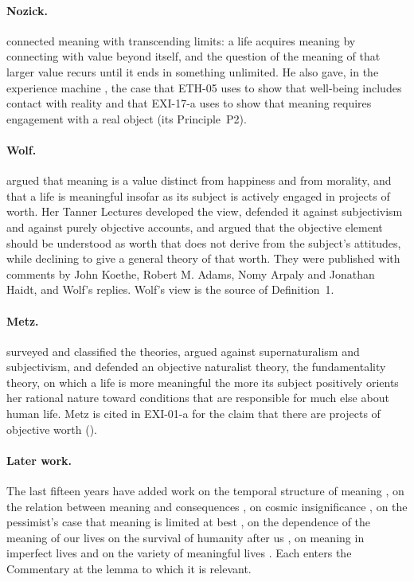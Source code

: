 \paragraph{Nozick.} \citet[ch.~6]{Nozick1981} connected meaning with transcending limits: a life acquires meaning by connecting with value beyond itself, and the question of the meaning of that larger value recurs until it ends in something unlimited. He also gave, in the experience machine \citep[42--45]{Nozick1974}, the case that ETH-05 uses to show that well-being includes contact with reality and that EXI-17-a uses to show that meaning requires engagement with a real object (its Principle~P2).

\paragraph{Wolf.} \citet{Wolf1997} argued that meaning is a value distinct from happiness and from morality, and that a life is meaningful insofar as its subject is actively engaged in projects of worth. Her Tanner Lectures \citep{Wolf2010} developed the view, defended it against subjectivism and against purely objective accounts, and argued that the objective element should be understood as worth that does not derive from the subject's attitudes, while declining to give a general theory of that worth. They were published with comments by John Koethe, Robert M. Adams, Nomy Arpaly and Jonathan Haidt, and Wolf's replies. Wolf's view is the source of Definition~1.

\paragraph{Metz.} \citet{Metz2013} surveyed and classified the theories, argued against supernaturalism and subjectivism, and defended an objective naturalist theory, the fundamentality theory, on which a life is more meaningful the more its subject positively orients her rational nature toward conditions that are responsible for much else about human life. Metz is cited in EXI-01-a for the claim that there are projects of objective worth ().

\paragraph{Later work.} The last fifteen years have added work on the temporal structure of meaning \citep{Kauppinen2012}, on the relation between meaning and consequences \citep{Smuts2013}, on cosmic insignificance \citep{Kahane2014}, on the pessimist's case that meaning is limited at best \citep{Benatar2017}, on the dependence of the meaning of our lives on the survival of humanity after us \citep{Scheffler2013}, on meaning in imperfect lives \citep{Landau2017} and on the variety of meaningful lives \citep{May2015}. Each enters the Commentary at the lemma to which it is relevant.


